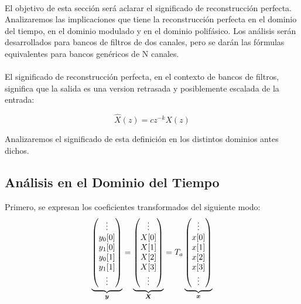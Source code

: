 \paragraph{}
El objetivo de esta sección será aclarar el significado de reconstrucción perfecta. Analizaremos las implicaciones que tiene la reconstrucción perfecta en el dominio del tiempo, en el dominio modulado y en el dominio polifásico. Los análisis serán desarrollados para bancos de filtros de dos canales, pero se darán las fórmulas equivalentes para bancos genéricos de N canales.
\paragraph{}
El significado de reconstrucción perfecta, en el contexto de bancos de filtros, significa que la salida es una version retrasada y posiblemente escalada de la entrada:

\begin{equation}
	\hat{X}(z) = c z^{-k} X(z)
	\label{eq:recons_perf}
\end{equation}

Analizaremos el significado de esta definición en los distintos dominios antes dichos.

\subsection{Análisis en el Dominio del Tiempo}


Primero, se expresan los coeficientes transformados del siguiente modo:
	\begin{equation}
		\underbrace{\begin{pmatrix}
					\vdots \\
					y_0[0] \\
					y_1[0] \\
					y_0[1] \\
					y_1[1] \\
					\vdots \\
				\end{pmatrix}
		}_{\boldsymbol{y}}
		=
		\underbrace{\begin{pmatrix}
					\vdots \\
					X[0] \\
					X[1] \\
					X[2] \\
					X[3] \\
					\vdots \\
				\end{pmatrix}
		}_{\boldsymbol{X}}
		= T_a 
		\underbrace{\begin{pmatrix}
					\vdots \\
					x[0] \\
					x[1] \\
					x[2] \\
					x[3] \\
					\vdots \\
				\end{pmatrix}
		}_{\boldsymbol{x}}
	\end{equation}

